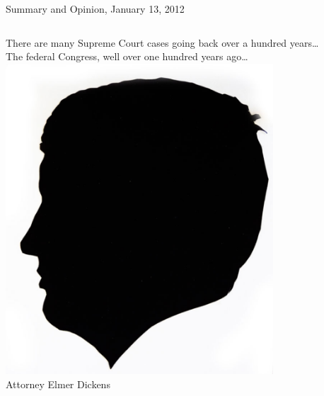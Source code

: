 \documentclass{beamer}
\begin{document}
\begin{frame}{Summary and Opinion, January 13, 2012}
    \begin{columns}[onlytextwidth]
        There are many Supreme Court cases going back over a hundred years\ldots \\
        \vspace{16pt}
        The federal Congress, well over one hundred years ago\ldots
            \centering
            \includegraphics[width=0.75\textwidth]{img/elmer-dickens.png}
            \\ Attorney Elmer Dickens \\
    \end{columns}
\end{frame}
\end{document}
